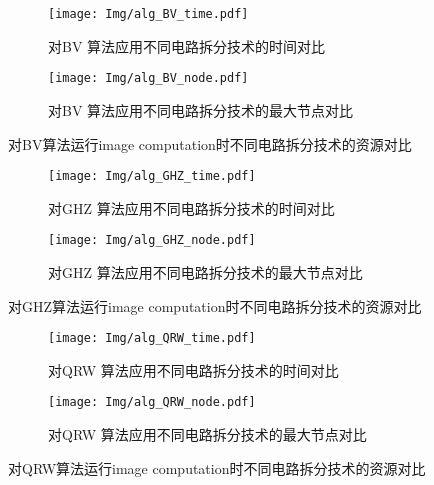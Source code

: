 \begin{figure}[!htbp]
    \centering
    \begin{subfigure}[b]{.4\textwidth}
        \centering
        \texttt{[image: Img/alg\_BV\_time.pdf]}
        \caption{对BV 算法应用不同电路拆分技术的时间对比}
        \label{fig:BV-time}
    \end{subfigure}
    \qquad
    \begin{subfigure}[b]{.4\textwidth}
        \centering
        \texttt{[image: Img/alg\_BV\_node.pdf]}
        \caption{对BV 算法应用不同电路拆分技术的最大节点对比}
        \label{fig:BV-node}
    \end{subfigure}
    \caption{对BV算法运行image computation时不同电路拆分技术的资源对比}
    \label{fig:BV-compare}
\end{figure}
\begin{figure}[!htbp]
    \centering
    \begin{subfigure}[b]{.4\textwidth}
        \centering
        \texttt{[image: Img/alg\_GHZ\_time.pdf]}
        \caption{对GHZ 算法应用不同电路拆分技术的时间对比}
        \label{fig:GHZ-time}
    \end{subfigure}
    \qquad
    \begin{subfigure}[b]{.4\textwidth}
        \centering
        \texttt{[image: Img/alg\_GHZ\_node.pdf]}
        \caption{对GHZ 算法应用不同电路拆分技术的最大节点对比}
        \label{fig:GHZ-node}
    \end{subfigure}
    \caption{对GHZ算法运行image computation时不同电路拆分技术的资源对比}
    \label{fig:GHZ-compare}
\end{figure}
\begin{figure}[!htbp]
    \centering
    \begin{subfigure}[b]{.4\textwidth}
        \centering
        \texttt{[image: Img/alg\_QRW\_time.pdf]}
        \caption{对QRW 算法应用不同电路拆分技术的时间对比}
        \label{fig:QRW-time}
    \end{subfigure}
    \qquad
    \begin{subfigure}[b]{.4\textwidth}
        \centering
        \texttt{[image: Img/alg\_QRW\_node.pdf]}
        \caption{对QRW 算法应用不同电路拆分技术的最大节点对比}
        \label{fig:QRW-node}
    \end{subfigure}
    \caption{对QRW算法运行image computation时不同电路拆分技术的资源对比}
    \label{fig:QRW-compare}
\end{figure}

